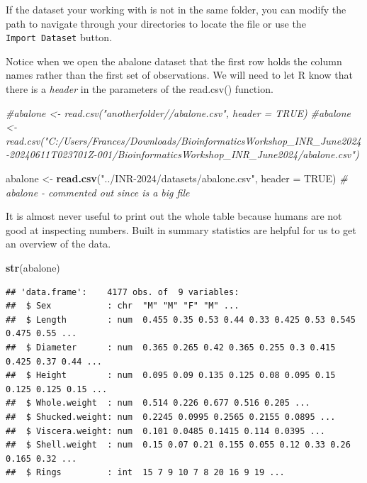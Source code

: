 \documentclass[
]{book}
\newenvironment{Shaded}{\begin{snugshade}}{\end{snugshade}}
\newcommand{\AttributeTok}[1]{\textcolor[rgb]{0.13,0.29,0.53}{#1}}
\newcommand{\CommentTok}[1]{\textcolor[rgb]{0.56,0.35,0.01}{\textit{#1}}}
\newcommand{\ConstantTok}[1]{\textcolor[rgb]{0.56,0.35,0.01}{#1}}
\newcommand{\FunctionTok}[1]{\textcolor[rgb]{0.13,0.29,0.53}{\textbf{#1}}}
\newcommand{\NormalTok}[1]{#1}
\newcommand{\OtherTok}[1]{\textcolor[rgb]{0.56,0.35,0.01}{#1}}
\newcommand{\StringTok}[1]{\textcolor[rgb]{0.31,0.60,0.02}{#1}}
\begin{document}
If the dataset your working with is not in the same folder, you can modify the path to navigate through your directories to locate the file or use the \texttt{Import\ Dataset} button.

Notice when we open the abalone dataset that the first row holds the column names rather than the first set of observations. We will need to let R know that there is a \emph{header} in the parameters of the read.csv() function.

\begin{Shaded}
\begin{Highlighting}[]
\CommentTok{\#abalone \textless{}{-} read.csv("anotherfolder//abalone.csv", header = TRUE)}
\CommentTok{\#abalone \textless{}{-} read.csv("C:/Users/Frances/Downloads/BioinformaticsWorkshop\_INR\_June2024{-}20240611T023701Z{-}001/BioinformaticsWorkshop\_INR\_June2024/abalone.csv")}

\NormalTok{abalone }\OtherTok{\textless{}{-}} \FunctionTok{read.csv}\NormalTok{(}\StringTok{"../INR{-}2024/datasets/abalone.csv"}\NormalTok{, }\AttributeTok{header =} \ConstantTok{TRUE}\NormalTok{)}
\CommentTok{\# abalone {-} commented out since is a big file}
\end{Highlighting}
\end{Shaded}

It is almost never useful to print out the whole table because humans are not good at inspecting numbers. Built in summary statistics are helpful for us to get an overview of the data.

\begin{Shaded}
\begin{Highlighting}[]
\FunctionTok{str}\NormalTok{(abalone)}
\end{Highlighting}
\end{Shaded}

\begin{verbatim}
## 'data.frame':    4177 obs. of  9 variables:
##  $ Sex           : chr  "M" "M" "F" "M" ...
##  $ Length        : num  0.455 0.35 0.53 0.44 0.33 0.425 0.53 0.545 0.475 0.55 ...
##  $ Diameter      : num  0.365 0.265 0.42 0.365 0.255 0.3 0.415 0.425 0.37 0.44 ...
##  $ Height        : num  0.095 0.09 0.135 0.125 0.08 0.095 0.15 0.125 0.125 0.15 ...
##  $ Whole.weight  : num  0.514 0.226 0.677 0.516 0.205 ...
##  $ Shucked.weight: num  0.2245 0.0995 0.2565 0.2155 0.0895 ...
##  $ Viscera.weight: num  0.101 0.0485 0.1415 0.114 0.0395 ...
##  $ Shell.weight  : num  0.15 0.07 0.21 0.155 0.055 0.12 0.33 0.26 0.165 0.32 ...
##  $ Rings         : int  15 7 9 10 7 8 20 16 9 19 ...
\end{verbatim}
\end{document}
